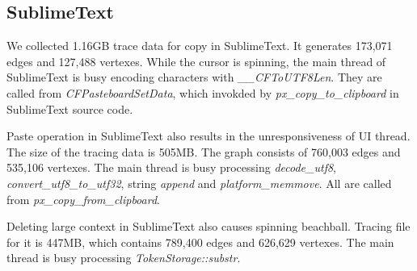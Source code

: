 \subsection{SublimeText}

We collected 1.16GB trace data for copy in SublimeText. It generates 173,071
edges and 127,488 vertexes.  While the cursor is spinning, the main thread of
SublimeText is busy encoding characters with \textit{\_\_CFToUTF8Len}.  They
are called from \textit{CFPasteboardSetData}, which invokded by
\textit{px\_copy\_to\_clipboard} in SublimeText source code.

Paste operation in SublimeText also results in the unresponsiveness of UI
thread.  The size of the tracing data is 505MB. The graph consists of 760,003
edges and 535,106 vertexes.  The main thread is busy processing
\textit{decode\_utf8}, \textit{convert\_utf8\_to\_utf32}, string
\textit{append} and \textit{platform\_memmove}.  All are called from
\textit{px\_copy\_from\_clipboard}.

Deleting large context in SublimeText also causes spinning beachball.  Tracing
file for it is 447MB, which contains 789,400 edges and 626,629 vertexes.  The
main thread is busy processing \textit{TokenStorage::substr}.
